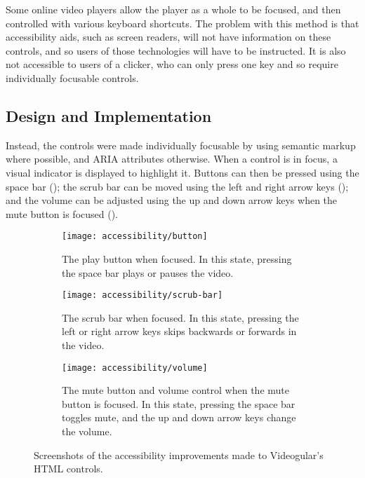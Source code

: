 Some online video players allow the player as a whole to be focused, and then controlled with various keyboard shortcuts. The problem with this method is that accessibility aids, such as screen readers, will not have information on these controls, and so users of those technologies will have to be instructed. It is also not accessible to users of a clicker, who can only press one key and so require individually focusable controls.

\subsection{Design and Implementation}
Instead, the controls were made individually focusable by using semantic markup where possible, and \gls{ARIA} attributes otherwise. When a control is in focus, a visual indicator is displayed to highlight it. Buttons can then be pressed using the space bar (); the scrub bar can be moved using the left and right arrow keys (); and the volume can be adjusted using the up and down arrow keys when the mute button is focused ().

\begin{figure}
	\begin{subfigure}[]{\textwidth}
		\texttt{[image: accessibility/button]}
		\caption{The play button when focused. In this state, pressing the space bar plays or pauses the video.}
		\label{Figure:Accessibility/Screenshots/Button}
	\end{subfigure}
	\begin{subfigure}[]{\textwidth}
		\texttt{[image: accessibility/scrub-bar]}
		\caption{The scrub bar when focused. In this state, pressing the left or right arrow keys skips backwards or forwards in the video.}
		\label{Figure:Accessibility/Screenshots/ScrubBar}
	\end{subfigure}
	\begin{subfigure}[]{\textwidth}
		\texttt{[image: accessibility/volume]}
		\caption{The mute button and volume control when the mute button is focused. In this state, pressing the space bar toggles mute, and the up and down arrow keys change the volume.}
		\label{Figure:Accessibility/Screenshots/Volume}
	\end{subfigure}
	\caption{Screenshots of the accessibility improvements made to Videogular's HTML controls.}
	\label{Figure:Accessibility/Screenshots}
\end{figure}

